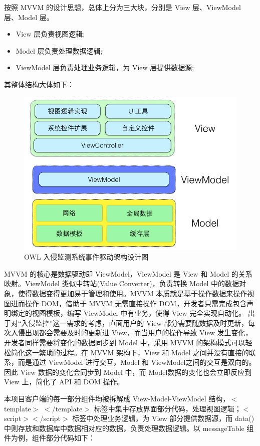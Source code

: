 \documentclass[article]{BJTU-thesis}
\begin{document}
按照 MVVM 的设计思想，总体上分为三大块，分别是 View 层、ViewModel 层、Model 层。
\begin{itemize}
\item View 层负责视图逻辑;
\item Model 层负责处理数据逻辑;
\item ViewModel 层负责处理业务逻辑，为 View 层提供数据源;
\end{itemize}
其整体结构大体如下：
\begin{figure}[!htbp]
	\centering
	\includegraphics[scale=.75]{img/t7.png}
	\caption{OWL 入侵监测系统事件驱动架构设计图}
\end{figure}

MVVM 的核心是数据驱动即 ViewModel，ViewModel 是 View 和 Model 的关系映射。ViewModel 类似中转站(Value Converter)，负责转换 Model 中的数据对象，使得数据变得更加易于管理和使用。MVVM 本质就是基于操作数据来操作视图进而操作 DOM，借助于 MVVM 无需直接操作 DOM，开发者只需完成包含声明绑定的视图模板，编写 ViewModel 中有业务，使得 View 完全实现自动化。
\newpage
出于对“入侵监控”这一需求的考虑，直面用户的 View 部分需要随数据及时更新，每次入侵出现都会需要及时的更新进 View，而当用户的操作导致 View 发生变化，开发者同样需要将变化的数据同步到 Model 中，采用 MVVM 的架构模式可以轻松简化这一繁琐的过程。在 MVVM 架构下，View 和 Model 之间并没有直接的联系，而是通过 ViewModel 进行交互，Model 和 ViewModel之间的交互是双向的。因此 View 数据的变化会同步到 Model 中，而 Model数据的变化也会立即反应到 View 上，简化了 API 和 DOM 操作。

本项目客户端的每一部分组件均被拆解成 View-Model-ViewModel 结构，$<$template$>$ $<$/template$>$ 标签中集中存放界面部分代码，处理视图逻辑；$<$script$><$/script$>$ 标签中处理业务逻辑，为 View 部分提供数据源，而 data(){} 中则存放和数据库中数据相对应的数据，负责处理数据逻辑。以 messageTable 组件为例，组件部分代码如下：
\end{document}
